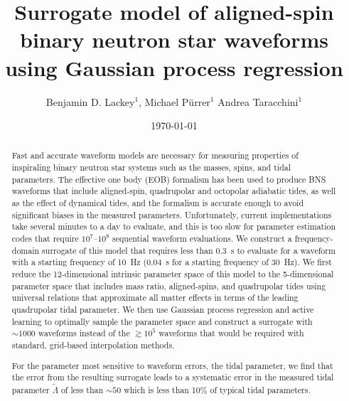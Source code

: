\documentclass[prd,aps,letter,twocolumn,floatfix,notitlepage,nofootinbib]{revtex4-1}
\begin{document}
\title{Surrogate model of aligned-spin binary neutron star waveforms using Gaussian process regression}

\author{
Benjamin D. Lackey$^1$, 
Michael P\"{u}rrer$^1$
Andrea Taracchini$^1$
}

\date{\today}

\begin{abstract}

Fast and accurate waveform models are necessary for measuring properties of inspiraling binary neutron star systems such as the masses, spins, and tidal parameters. The effective one body (EOB) formalism has been used to produce BNS waveforms that include aligned-spin, quadrupolar and octopolar adiabatic tides, as well as the effect of dynamical tides, and the formalism is accurate enough to avoid significant biases in the measured parameters. Unfortunately, current implementations take several minutes to a day to evaluate, and this is too slow for parameter estimation codes that require $10^7$--$10^8$ sequential waveform evaluations. We construct a frequency-domain surrogate of this model that requires less than 0.3~s to evaluate for a waveform with a starting frequency of 10~Hz (0.04~s for a starting frequency of 30~Hz). We first reduce the 12-dimensional intrinsic parameter space of this model to the 5-dimensional parameter space that includes mass ratio, aligned-spins, and quadrupolar tides using universal relations that approximate all matter effects in terms of the leading quadrupolar tidal parameter. We then use Gaussian process regression and active learning to optimally sample the parameter space and construct a surrogate with $\sim 1000$ waveforms instead of the $\gtrsim 10^5$ waveforms that would be required with standard, grid-based interpolation methods. 

For the parameter most sensitive to waveform errors, the tidal parameter, we find that the error from the resulting surrogate leads to a systematic error in the measured tidal parameter $\tilde\Lambda$ of less than $\sim 50$ which is less than 10\% of typical tidal parameters.


\end{abstract}

\end{document}
